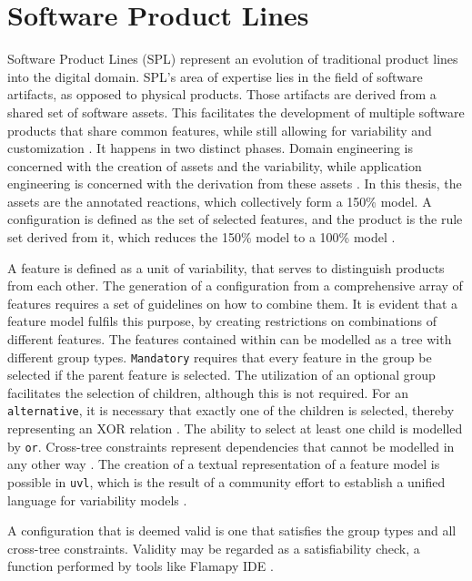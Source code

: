 \section{Software Product Lines}
\label{sec:Foundations:SoftwareProductLines}

Software Product Lines (SPL) represent an evolution of traditional product lines into the digital domain.
SPL's area of expertise lies in the field of software artifacts, as opposed to physical products.
Those artifacts are derived from a shared set of software assets.
This facilitates the development of multiple software products that share common features, while still allowing for variability and customization \cite{clements2002software,bachmann2005variability}.
It happens in two distinct phases.
Domain engineering is concerned with the creation of assets and the variability, while application engineering is concerned with the derivation from these assets \cite{pohl2005software,apel2013software}.
In this thesis, the assets are the annotated reactions, which collectively form a 150\% model.
A configuration is defined as the set of selected features, and the product is the rule set derived from it, which reduces the 150\% model to a 100\% model \cite{kaestner2008granularity,czarnecki2005mapping}.

A feature is defined as a unit of variability, that serves to distinguish products from each other.
The generation of a configuration from a comprehensive array of features requires a set of guidelines on how to combine them.
It is evident that a feature model fulfils this purpose, by creating restrictions on combinations of different features.
The features contained within can be modelled as a tree with different group types.
\texttt{Mandatory} requires that every feature in the group be selected if the parent feature is selected.
The utilization of an optional group facilitates the selection of children, although this is not required.
For an \texttt{alternative}, it is necessary that exactly one of the children is selected, thereby representing an XOR relation \cite{van2001notion,kang1990feature}.
The ability to select at least one child is modelled by \texttt{or}.
Cross-tree constraints represent dependencies that cannot be modelled in any other way \cite{nevsic2019principles}.
The creation of a textual representation of a feature model is possible in \texttt{uvl}, which is the result of a community effort to establish a unified language for variability models \cite{uvl}.

A configuration that is deemed valid is one that satisfies the group types and all cross-tree constraints.
Validity may be regarded as a satisfiability check, a function performed by tools like Flamapy IDE \cite{white2010automated,flamapy-ide,kastner2009featureide}.